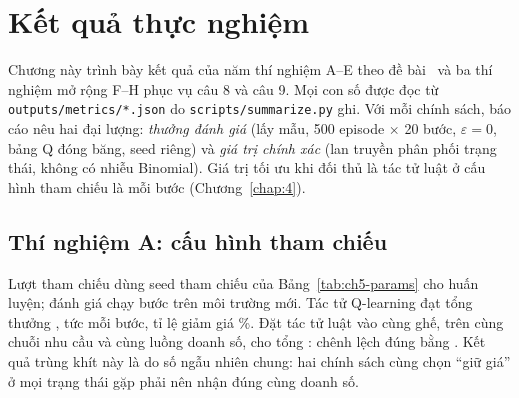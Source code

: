 \chapter{Kết quả thực nghiệm}\label{chap:6}

Chương này trình bày kết quả của năm thí nghiệm A--E theo đề bài~\cite{lab02} và ba thí nghiệm mở rộng F--H phục vụ câu 8 và câu 9. Mọi con số được đọc từ \texttt{outputs/metrics/*.json} do \texttt{scripts/summarize.py} ghi. Với mỗi chính sách, báo cáo nêu hai đại lượng: \emph{thưởng đánh giá} (lấy mẫu, 500 episode $\times$ 20 bước, $\varepsilon=0$, bảng Q đóng băng, seed riêng) và \emph{giá trị chính xác} (lan truyền phân phối trạng thái, không có nhiễu Binomial). Giá trị tối ưu khi đối thủ là tác tử luật ở cấu hình tham chiếu là  mỗi bước (Chương~\ref{chap:4}).

\section{Thí nghiệm A: cấu hình tham chiếu}\label{sec:ch6-a}

Lượt tham chiếu dùng seed tham chiếu của Bảng~\ref{tab:ch5-params} cho huấn luyện; đánh giá chạy  bước trên môi trường mới. Tác tử Q-learning đạt tổng thưởng , tức  mỗi bước, tỉ lệ giảm giá \%. Đặt tác tử luật vào cùng ghế, trên cùng chuỗi nhu cầu và cùng luồng doanh số, cho tổng : chênh lệch đúng bằng . Kết quả trùng khít này là do số ngẫu nhiên chung: hai chính sách cùng chọn ``giữ giá'' ở mọi trạng thái gặp phải nên nhận đúng cùng doanh số.




